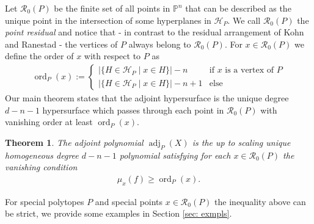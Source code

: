 \documentclass[a4paper,10pt]{amsart}
\theoremstyle{definition}
\theoremstyle{plain}
\newtheorem{thm}[defin]{Theorem}
\newcommand{\ord}{\operatorname{ord}}
\newcommand{\adj}{\operatorname{adj}} %
\newcommand{\cH}{{\mathcal H}}
\newcommand{\cR}{{\mathcal R}}
\newcommand{\pp}{\mathbb{P}}
\begin{document}
Let $\cR_0(P)$ be the finite set of all points in $\pp^n$ that can be described as the unique point in the intersection of some hyperplanes in $\cH_P$. We call $\cR_0(P)$ the \emph{point residual} and notice that - in contrast to the residual arrangement of Kohn and Ranestad - the vertices of $P$ always belong to $\cR_0(P)$. For $x\in \cR_0(P)$ we define the order of $x$ with respect to $P$ as \begin{align*}
    \ord_P(x):=\begin{cases}
        |\{H\in \cH_P\mid x\in H\}|-n &\text{if }x\text{ is a vertex of }P \\
         |\{H\in \cH_P\mid x\in H\}|-n+1 &\text{else}
    \end{cases}
\end{align*}
Our main theorem states that the adjoint hypersurface is the unique degree $d-n-1$ hypersurface which passes through each point in $\cR_0(P)$ with vanishing order at least $\ord_P(x)$.
\begin{thm}
    \label{thm:intro_main_thm}
    The adjoint polynomial $\adj_P(X)$ is the up to scaling unique homogeneous degree $d-n-1$ polynomial satisfying for each $x\in \cR_0(P)$ the vanishing condition \begin{align*}
        \mu_x(f)\geq \ord_P(x).
    \end{align*}
\end{thm}
For special polytopes $P$ and special points $x \in \cR_0(P)$ the inequality above can be strict, we provide some examples in Section \ref{sec: exmpls}.
\end{document}
